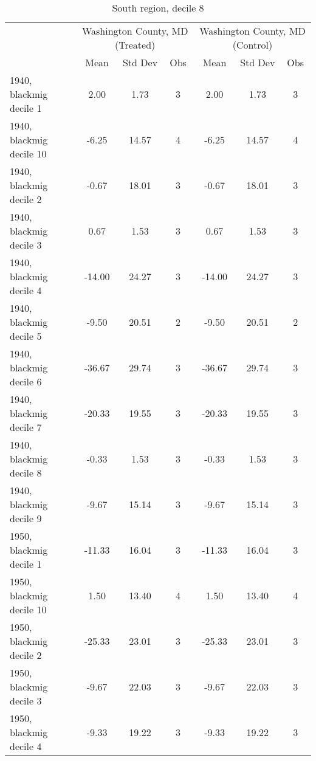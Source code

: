 \begin{table}[htbp]\centering
\def\sym#1{\ifmmode^{#1}\else\(^{#1}\)\fi}
\caption{South region, decile 8 \label{tab1}}
\begin{tabular}{l*{2}{ccc}}
\toprule
                    &\multicolumn{3}{c}{Washington County, MD (Treated)}&\multicolumn{3}{c}{Washington County, MD (Control)}\\
                    &        Mean&     Std Dev&         Obs&        Mean&     Std Dev&         Obs\\
\midrule
1940, blackmig decile 1&        2.00&        1.73&           3&        2.00&        1.73&           3\\
1940, blackmig decile 10&       -6.25&       14.57&           4&       -6.25&       14.57&           4\\
1940, blackmig decile 2&       -0.67&       18.01&           3&       -0.67&       18.01&           3\\
1940, blackmig decile 3&        0.67&        1.53&           3&        0.67&        1.53&           3\\
1940, blackmig decile 4&      -14.00&       24.27&           3&      -14.00&       24.27&           3\\
1940, blackmig decile 5&       -9.50&       20.51&           2&       -9.50&       20.51&           2\\
1940, blackmig decile 6&      -36.67&       29.74&           3&      -36.67&       29.74&           3\\
1940, blackmig decile 7&      -20.33&       19.55&           3&      -20.33&       19.55&           3\\
1940, blackmig decile 8&       -0.33&        1.53&           3&       -0.33&        1.53&           3\\
1940, blackmig decile 9&       -9.67&       15.14&           3&       -9.67&       15.14&           3\\
1950, blackmig decile 1&      -11.33&       16.04&           3&      -11.33&       16.04&           3\\
1950, blackmig decile 10&        1.50&       13.40&           4&        1.50&       13.40&           4\\
1950, blackmig decile 2&      -25.33&       23.01&           3&      -25.33&       23.01&           3\\
1950, blackmig decile 3&       -9.67&       22.03&           3&       -9.67&       22.03&           3\\
1950, blackmig decile 4&       -9.33&       19.22&           3&       -9.33&       19.22&           3\\

\end{tabular}
\end{table}

